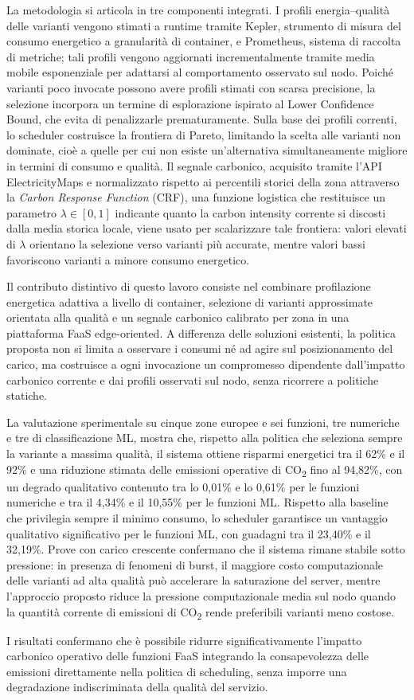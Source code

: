 La metodologia si articola in tre componenti integrati. I profili energia--qualità
delle varianti vengono stimati a runtime tramite Kepler, strumento di misura del
consumo energetico a granularità di container, e Prometheus, sistema di raccolta
di metriche; tali profili vengono aggiornati incrementalmente tramite media mobile
esponenziale per adattarsi al comportamento osservato sul nodo. Poiché varianti
poco invocate possono avere profili stimati con scarsa precisione, la selezione
incorpora un termine di esplorazione ispirato al Lower Confidence Bound, che evita
di penalizzarle prematuramente. Sulla base dei profili correnti, lo scheduler
costruisce la frontiera di Pareto, limitando la scelta alle varianti non
dominate, cioè a quelle per cui non esiste un'alternativa simultaneamente
migliore in termini di consumo e qualità. Il
segnale carbonico, acquisito tramite l'API ElectricityMaps e normalizzato rispetto
ai percentili storici della zona attraverso la \emph{Carbon Response Function}
(CRF), una funzione logistica che restituisce un parametro $\lambda \in [0,1]$
indicante quanto la carbon intensity corrente si discosti dalla media storica
locale, viene usato per scalarizzare tale frontiera: valori elevati di $\lambda$
orientano la selezione verso varianti più accurate, mentre valori bassi
favoriscono varianti a minore consumo energetico.

Il contributo distintivo di questo lavoro consiste nel combinare profilazione
energetica adattiva a livello di container, selezione di varianti approssimate
orientata alla qualità e un segnale carbonico calibrato per zona in una
piattaforma FaaS edge-oriented. A differenza delle soluzioni esistenti, la
politica proposta non si limita a osservare i consumi né ad agire sul
posizionamento del carico, ma costruisce a ogni invocazione un compromesso
dipendente dall'impatto carbonico corrente e dai profili osservati sul nodo,
senza ricorrere a politiche statiche.

La valutazione sperimentale su cinque zone
europee e sei funzioni, tre numeriche e tre di classificazione ML, mostra che,
rispetto alla politica che seleziona sempre la variante a massima qualità, il
sistema ottiene risparmi energetici tra il 62\% e il 92\% e una riduzione
stimata delle emissioni operative di CO\textsubscript{2} fino al 94{,}82\%,
con un degrado qualitativo contenuto tra lo 0{,}01\% e lo 0{,}61\% per le
funzioni numeriche e tra il 4{,}34\% e il 10{,}55\% per le funzioni ML.
Rispetto alla baseline che privilegia sempre il minimo consumo, lo scheduler
garantisce un vantaggio qualitativo significativo per le funzioni ML,
con guadagni tra il 23{,}40\% e il 32{,}19\%. Prove con carico crescente confermano che il sistema rimane stabile
sotto pressione: in presenza di fenomeni di burst, il maggiore costo
computazionale delle varianti ad alta qualità può accelerare la saturazione
del server, mentre l'approccio proposto riduce la pressione computazionale
media sul nodo quando la quantità corrente di emissioni di CO\textsubscript{2}
rende preferibili varianti meno costose.

I risultati confermano che è possibile ridurre significativamente l'impatto
carbonico operativo delle funzioni FaaS integrando la consapevolezza delle
emissioni direttamente nella politica di scheduling, senza imporre una
degradazione indiscriminata della qualità del servizio.
